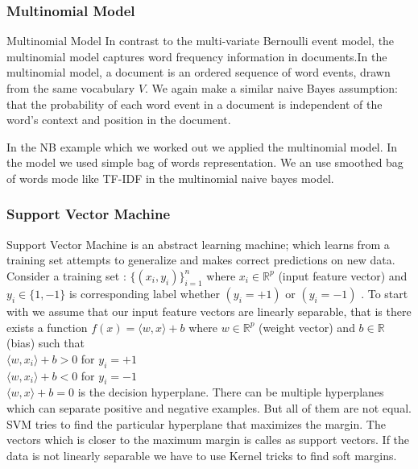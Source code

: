 \documentclass[serif,11pt,aspectratio=1610,table]{beamer}
\begin{document}
\begin{frame}[fragile]
 \frametitle{Multinomial Model}
\footnotesize
\begin{block}{Multinomial Model}
 In contrast to the multi-variate Bernoulli event model, the multinomial model captures word frequency information in documents.In the multinomial model, a document is an ordered sequence of word events, drawn from the same vocabulary $V$. We again make a similar naive Bayes assumption: that the probability of each word event in a document is independent of the word's context and position in the document.
\end{block}
\scriptsize
In the NB example which we worked out we applied the multinomial model. In the model we used simple bag of words representation. We an use smoothed bag of words mode like TF-IDF in the multinomial naive bayes model. 
\end{frame}


\begin{frame}
 \frametitle{Support Vector Machine}
 Support Vector Machine is an abstract learning machine; which learns from a training set attempts to generalize and makes correct predictions on new data. Consider a training set : $ \{(x_{i},y_{i})\}^{n} _{i=1}$  where  $x_{i} \in \mathbb{R}^{p}$ (input feature vector) and $y_{i} \in \{1,-1\}$ is corresponding label whether $(y_{i} = +1)$ or $(y_{i} = -1)$ . To start with we assume that our input feature vectors are linearly separable, that is there exists a function $f(x) = \langle w,x \rangle + b $ where $w \in \mathbb{R}^{p}$ (weight vector) and $b \in \mathbb{R}$ (bias) such that \\
 \vspace{0.3 cm}
 $\langle w, x_{i} \rangle + b > 0 $ for $y_{i} = +1 $ \\
 $\langle w,x_{i} \rangle + b < 0 $ for $y_{i} = -1 $ \\
 \vspace{0.3 cm}
 $\langle w, x \rangle + b = 0 $ is the decision hyperplane. There can be multiple hyperplanes which can separate positive and negative examples.  But all of them are not equal. SVM tries to find the particular hyperplane that maximizes the margin. The vectors which is closer to the maximum margin is calles as support vectors. If the data is not linearly separable we have to use Kernel tricks to find soft margins. 
\end{frame}
\end{document}
